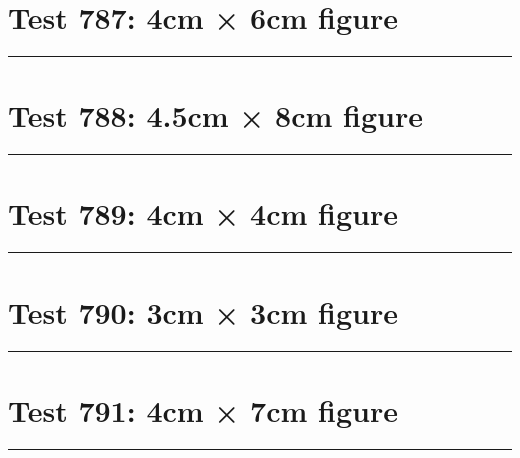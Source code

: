 \documentclass[a4paper,11pt]{article}
\begin{document}
\section*{Test 787: 4cm × 6cm figure}
\begin{swarmwrap}%
  \begin{minipage}[t]{4cm}
    \centering
    \rule{\linewidth}{6cm}
  \end{minipage}%
\end{swarmwrap}%
\swarmwrapnext
\lipsum[110]
\lipsum[111]
\lipsum[112]
\lipsum[113]
\lipsum[114]
\lipsum[115]
\section*{Test 788: 4.5cm × 8cm figure}
\begin{swarmwrap}%
  \begin{minipage}[t]{4cm}
    \centering
    \rule{\linewidth}{8cm}
  \end{minipage}%
\end{swarmwrap}%
\swarmwrapnext
\lipsum[139]
\lipsum[140]
\lipsum[141]
\section*{Test 789: 4cm × 4cm figure}
\begin{swarmwrap}%
  \begin{minipage}[t]{4cm}
    \centering
    \rule{\linewidth}{4cm}
  \end{minipage}%
\end{swarmwrap}%
\swarmwrapnext
\lipsum[23]
\lipsum[24]
\lipsum[25]
\lipsum[26]
\lipsum[27]
\section*{Test 790: 3cm × 3cm figure}
\begin{swarmwrap}%
  \begin{minipage}[t]{3cm}
    \centering
    \rule{\linewidth}{3cm}
  \end{minipage}%
\end{swarmwrap}%
\swarmwrapnext
\lipsum[41]
\lipsum[42]
\lipsum[43]
\lipsum[44]
\section*{Test 791: 4cm × 7cm figure}
\begin{swarmwrap}%
  \begin{minipage}[t]{4cm}
    \centering
    \rule{\linewidth}{7cm}
  \end{minipage}%
\end{swarmwrap}%
\swarmwrapnext
\lipsum[18]
\lipsum[19]
\lipsum[20]
\lipsum[21]
\lipsum[22]
\lipsum[23]
\end{document}
